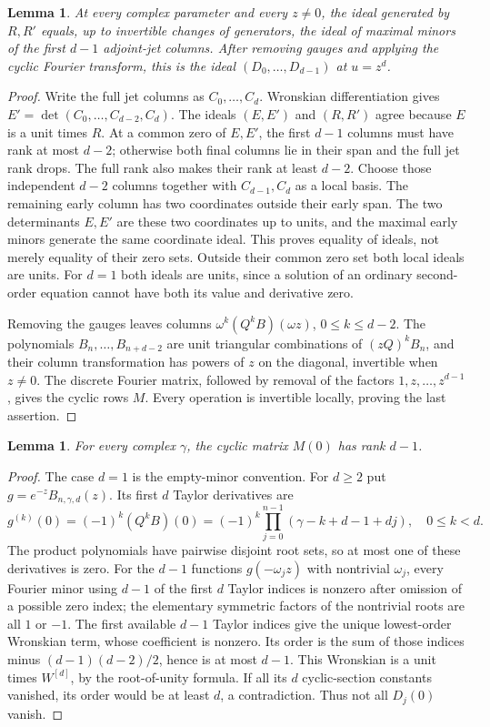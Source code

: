 \documentclass[11pt]{article}
\newtheorem{lemma}[theorem]{Lemma}
\begin{document}
\begin{lemma}\label{lem:critical-ideal}
At every complex parameter and every $z\ne0$, the ideal generated
by $R,R'$ equals, up to invertible changes of generators, the ideal
of maximal minors of the first $d-1$ adjoint-jet columns.
After removing gauges and applying the cyclic Fourier transform,
this is the ideal $(D_0,\ldots,D_{d-1})$ at $u=z^d$.
\end{lemma}
\begin{proof}
Write the full jet columns as $C_0,\ldots,C_d$.
Wronskian differentiation gives
$E'=\det(C_0,\ldots,C_{d-2},C_d)$.
The ideals $(E,E')$ and $(R,R')$ agree because $E$ is a unit times $R$.
At a common zero of $E,E'$, the first $d-1$ columns must have rank
at most $d-2$; otherwise both final columns lie in their span and
the full jet rank drops. The full rank also makes their rank at
least $d-2$. Choose those independent $d-2$ columns together with
$C_{d-1},C_d$ as a local basis. The remaining early column has two
coordinates outside their early span. The two determinants $E,E'$
are these two coordinates up to units, and the maximal early minors
generate the same coordinate ideal. This proves equality of ideals,
not merely equality of their zero sets. Outside their common zero
set both local ideals are units. For $d=1$ both ideals are
units, since a solution of an ordinary second-order equation cannot
have both its value and derivative zero.

Removing the gauges leaves columns
$\omega^k(Q^kB)(\omega z)$, $0\le k\le d-2$.
The polynomials $B_n,\ldots,B_{n+d-2}$ are unit triangular
combinations of $(zQ)^kB_n$, and their column transformation has
powers of $z$ on the diagonal, invertible when $z\ne0$.
The discrete Fourier matrix, followed by removal of the factors
$1,z,\ldots,z^{d-1}$, gives the cyclic rows $M$.
Every operation is invertible locally, proving the last assertion.
\end{proof}

\begin{lemma}\label{lem:no-origin}
For every complex $\gamma$, the cyclic matrix $M(0)$ has rank $d-1$.
\end{lemma}
\begin{proof}
The case $d=1$ is the empty-minor convention.
For $d\ge2$ put $g=e^{-z}B_{n,\gamma,d}(z)$.
Its first $d$ Taylor derivatives are
\[
 g^{(k)}(0)=(-1)^k(Q^kB)(0)
   =(-1)^k\prod_{j=0}^{n-1}(\gamma-k+d-1+dj),\quad0\le k<d.
\]
The product polynomials have pairwise disjoint root sets, so at most
one of these derivatives is zero.
For the $d-1$ functions $g(-\omega_jz)$ with nontrivial $\omega_j$,
every Fourier minor using $d-1$ of the first $d$ Taylor indices is
nonzero after omission of a possible zero index; the elementary
symmetric factors of the nontrivial roots are all $1$ or $-1$.
The first available $d-1$ Taylor indices give the unique lowest-order
Wronskian term, whose coefficient is nonzero.
Its order is the sum of those indices minus $(d-1)(d-2)/2$,
hence is at most $d-1$.
This Wronskian is a unit times $W^{[d]}$, by the root-of-unity formula.
If all its $d$ cyclic-section constants vanished, its order would be
at least $d$, a contradiction. Thus not all $D_j(0)$ vanish.
\end{proof}
\end{document}
